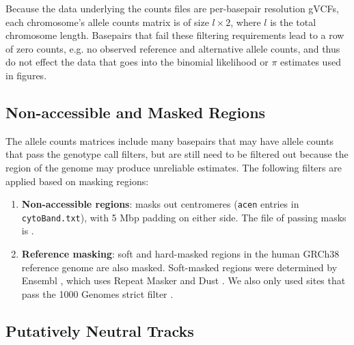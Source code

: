 \documentclass[11pt]{article}
\begin{document}
Because the data underlying the counts files are per-basepair resolution gVCFs,
each chromosome's allele counts matrix is of size $l \times 2$, where $l$ is
the total chromosome length. Basepairs that fail these filtering requirements
lead to a row of zero counts, e.g. no observed reference and alternative allele
counts, and thus do not effect the data that goes into the binomial likelihood
or $\pi$ estimates used in figures.

\subsection{Non-accessible and Masked Regions}
\label{supp:accessible}

The allele counts matrices include many basepairs that may have allele counts
that pass the genotype call filters, but are still need to be filtered out
because the region of the genome may produce unreliable estimates. The
following filters are applied based on masking regions:

\begin{enumerate}

  \item \textbf{Non-accessible regions}: masks out centromeres (\texttt{acen} entries in
    \texttt{cytoBand.txt}), with 5 Mbp padding on either side. The file of
    passing masks is . 

  \item \textbf{Reference masking}: soft and hard-masked regions in the human
      GRCh38 reference genome are also masked. Soft-masked regions were
      determined by Ensembl \parencite{Cunningham2022-vk}, which uses Repeat
      Masker \parencite{Smit2015-nm} and Dust \parencite{Morgulis2006-uo}. We
      also only used sites that pass the 1000 Genomes strict filter
      \parencite{1000_Genomes_Project_Consortium2015-mi}.

\end{enumerate}

\subsection{Putatively Neutral Tracks}
\label{supp:neutral}
\end{document}
